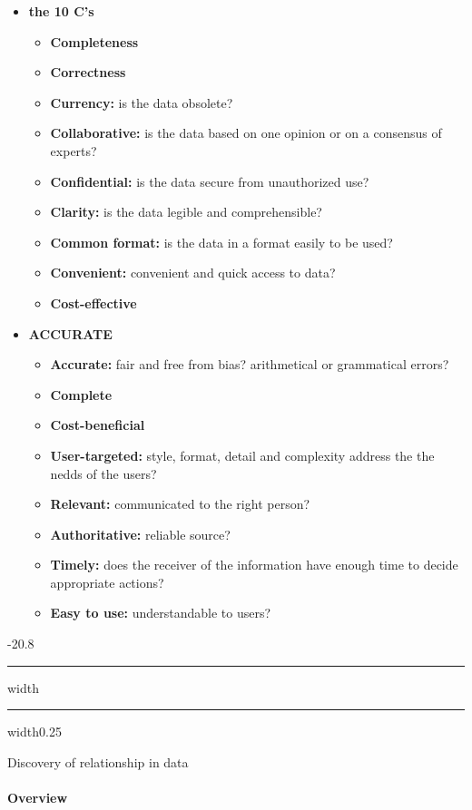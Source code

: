 \documentclass[a4paper, landscape, 6pt, fleqn]{scrartcl}
\makeatletter
\renewcommand{\emph}[1]{\textbf{#1}}
\renewcommand{\subsection}{\@startsection{subsection}{1}{0mm}%
{-2\baselineskip}{0.8\baselineskip}%
{\hrule depth 0.2pt width\columnwidth\hrule depth0.75pt
width0.25\columnwidth\vspace*{1.2em}\large\bfseries}}
\makeatother
\begin{document}
\begin{multicols*}{4}
\begin{itemize}
\item \emph{the 10 C's}
\begin{itemize}
\item \emph{Completeness}
\item \emph{Correctness}
\item \emph{Currency:} is the data obsolete?
\item \emph{Collaborative:} is the data based on one opinion or on a consensus of experts?
\item \emph{Confidential:} is the data secure from unauthorized use?
\item \emph{Clarity:} is the data legible and comprehensible?
\item \emph{Common format:} is the data in a format easily to be used?
\item \emph{Convenient:} convenient and quick access to data?
\item \emph{Cost-effective}
\end{itemize}
\item \emph{ACCURATE}
\begin{itemize}
\item \emph{Accurate:} fair and free from bias? arithmetical or grammatical errors?
\item \emph{Complete}
\item \emph{Cost-beneficial}
\item \emph{User-targeted:} style, format, detail and complexity address the the nedds of the users?
\item \emph{Relevant:} communicated to the right person?
\item \emph{Authoritative:} reliable source?
\item \emph{Timely:} does the receiver of the information have enough time to decide appropriate actions?
\item \emph{Easy to use:} understandable to users?
\end{itemize}
\end{itemize}

\subsection{Discovery of relationship in data}

\paragraph{Overview}


\end{multicols*}
\end{document}
